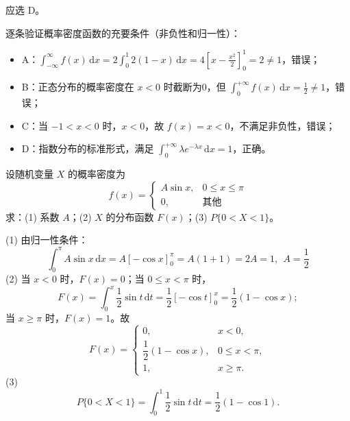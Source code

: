 \documentclass[lang=cn,11pt]{elegantbook}
\begin{document}
\begin{solution}
应选 D。

逐条验证概率密度函数的充要条件（非负性和归一性）：
\begin{itemize}
    \item A：$\displaystyle\int_{-\infty}^{\infty} f(x)\,\mathrm{d}x = 2\int_0^1 2(1-x)\,\mathrm{d}x = 4\left[x-\frac{x^2}{2}\right]_0^1 = 2 \neq 1$，错误；
    \item B：正态分布的概率密度在 $x<0$ 时截断为0，但 $\displaystyle\int_0^{+\infty} f(x)\,\mathrm{d}x = \frac{1}{2} \neq 1$，错误；
    \item C：当 $-1<x<0$ 时，$x<0$，故 $f(x)=x<0$，不满足非负性，错误；
    \item D：指数分布的标准形式，满足 $\displaystyle\int_0^{+\infty} \lambda e^{-\lambda x}\,\mathrm{d}x = 1$，正确。
\end{itemize}
\end{solution}

\begin{exercise}\label{exer:2-24}
设随机变量 $X$ 的概率密度为
\[
f(x) = \begin{cases} A\sin x, & 0 \le x \le \pi \\ 0, & \text{其他} \end{cases}
\]
求：(1) 系数 $A$；(2) $X$ 的分布函数 $F(x)$；(3) $P\{0<X<1\}$。
\end{exercise}
\begin{solution}
(1) 由归一性条件：
\[
\int_{0}^{\pi} A\sin x\,\mathrm{d}x = A[-\cos x]_{0}^{\pi} = A(1+1) = 2A = 1,~~A = \dfrac{1}{2}
\]
(2) 当 $x < 0$ 时，$F(x) = 0$；当 $0 \le x < \pi$ 时，
\[
F(x) = \int_{0}^{x} \frac{1}{2}\sin t\,\mathrm{d}t = \frac{1}{2}[-\cos t]_{0}^{x} = \frac{1}{2}(1-\cos x);
\]
当 $x \ge \pi$ 时，$F(x) = 1$。故
\[
F(x) = \begin{cases}
0, & x<0, \\[6pt]
\dfrac{1}{2}(1-\cos x), & 0 \le x < \pi, \\[6pt]
1, & x \ge \pi.
\end{cases}
\]
(3)
\[
P\{0<X<1\} = \int_{0}^{1} \frac{1}{2}\sin t\,\mathrm{d}t = \frac{1}{2}(1-\cos 1).
\]
\end{solution}
\end{document}
